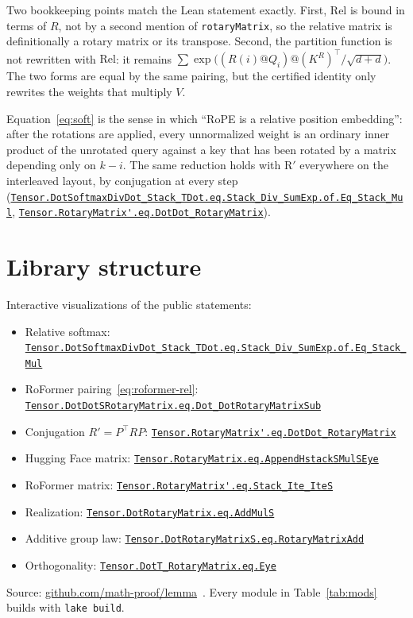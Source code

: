 \documentclass[11pt,a4paper]{article}
\newcommand{\lmod}[1]{\href{http://www.lemma.cn/lean/?module=#1}{\nolinkurl{#1}}}
\newcommand{\rot}{\mathrm{R}}
\newcommand{\Rel}{\mathrm{Rel}}
\begin{document}
Two bookkeeping points match the Lean statement exactly.
First, \(\Rel\) is bound in terms of \(R\), not by a second mention of \texttt{rotaryMatrix}, so the relative matrix is definitionally a rotary matrix or its transpose.
Second, the partition function is not rewritten with \(\Rel\): it remains
\(\sum\exp\bigl((R(i)@Q_i)@(K^R)^\top/\sqrt{d+d}\bigr)\).
The two forms are equal by the same pairing, but the certified identity only rewrites the weights that multiply \(V\).

Equation~\eqref{eq:soft} is the sense in which ``RoPE is a relative position embedding'': after the rotations are applied, every unnormalized weight is an ordinary inner product of the unrotated query against a key that has been rotated by a matrix depending only on $k-i$.
The same reduction holds with $\rot'$ everywhere on the interleaved layout, by conjugation at every step (\lmod{Tensor.DotSoftmaxDivDot_Stack_TDot.eq.Stack_Div_SumExp.of.Eq_Stack_Mul}, \lmod{Tensor.RotaryMatrix'.eq.DotDot_RotaryMatrix}).

\section{Library structure}
\label{sec:artifact}

Interactive visualizations of the public statements:
\begin{itemize}[noitemsep]
  \item Relative softmax:
    \lmod{Tensor.DotSoftmaxDivDot_Stack_TDot.eq.Stack_Div_SumExp.of.Eq_Stack_Mul}
  \item RoFormer pairing~\eqref{eq:roformer-rel}:
    \lmod{Tensor.DotDotSRotaryMatrix.eq.Dot_DotRotaryMatrixSub}
  \item Conjugation \(R'=P^\top RP\):
    \lmod{Tensor.RotaryMatrix'.eq.DotDot_RotaryMatrix}
  \item Hugging Face matrix:
    \lmod{Tensor.RotaryMatrix.eq.AppendHstackSMulSEye}
  \item RoFormer matrix:
    \lmod{Tensor.RotaryMatrix'.eq.Stack_Ite_IteS}
  \item Realization:
    \lmod{Tensor.DotRotaryMatrix.eq.AddMulS}
  \item Additive group law:
    \lmod{Tensor.DotRotaryMatrixS.eq.RotaryMatrixAdd}
  \item Orthogonality:
    \lmod{Tensor.DotT_RotaryMatrix.eq.Eye}
\end{itemize}
Source: \href{https://github.com/math-proof/lemma}{github.com/math-proof/lemma}~\cite{lemma_repo}.
Every module in Table~\ref{tab:mods} builds with \texttt{lake build}.
\end{document}
